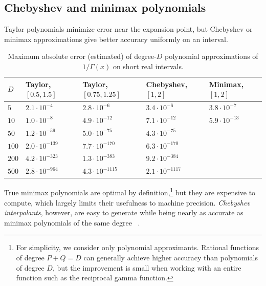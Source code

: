 \documentclass[reqno]{amsart}
\theoremstyle{definition}
\begin{document}
\subsection{Chebyshev and minimax polynomials}
\label{sect:taylorvs}

Taylor polynomials minimize error near the expansion point,
but Chebyshev or minimax approximations
give better accuracy uniformly on an interval.

\begin{table}
\setlength{\tabcolsep}{3pt}
\renewcommand{\arraystretch}{1.1}
\centering
\caption{Maximum absolute error (estimated) of degree-$D$ polynomial approximations of $1 / \Gamma(x)$ on short real intervals.}
\label{table:tabpolyapprox}
\small
\begin{tabular}{l | l l l l}
 $D$ & Taylor, $[0.5, 1.5]$ & Taylor, $[0.75, 1.25]$ & Chebyshev, $[1,2]$ & Minimax, $[1,2]$ \\
 \hline
 $5$  & $2.1 \cdot 10^{-4}$  &  $2.8 \cdot 10^{-6}$  &  $3.4 \cdot 10^{-6}$  &  $3.8 \cdot 10^{-7}$ \\
 $10$  & $1.0 \cdot 10^{-8}$  &  $4.9 \cdot 10^{-12}$  &  $7.1 \cdot 10^{-12}$  &  $5.9 \cdot 10^{-13}$ \\
 $50$  & $1.2 \cdot 10^{-59}$  &  $5.0 \cdot 10^{-75}$  &  $4.3 \cdot 10^{-75}$  &   \\
 $100$  & $2.0 \cdot 10^{-139}$  &  $7.7 \cdot 10^{-170}$  &  $6.3 \cdot 10^{-170}$  &   \\
 $200$  & $4.2 \cdot 10^{-323}$  &  $1.3 \cdot 10^{-383}$  &  $9.2 \cdot 10^{-384}$  &   \\
 $500$  & $2.8 \cdot 10^{-964}$  &  $4.3 \cdot 10^{-1115}$  &  $2.1 \cdot 10^{-1117}$  &   \\ [1ex]
\end{tabular}
\end{table}

True minimax polynomials are optimal by definition,\footnote{For simplicity, we consider only polynomial approximants. Rational
functions of degree $P + Q = D$ can generally achieve higher accuracy
than polynomials of degree $D$,
but the improvement is small when working with
an entire function such as the reciprocal gamma function.}
but they are expensive to compute,
which largely limits their usefulness to machine precision.
\emph{Chebyshev interpolants}, however, are easy to generate
while being nearly as accurate as minimax polynomials
of the same degree~\cite[Section 3.11]{DLMF} \cite[Theorem 16.1]{trefethen2019approximation}.
\end{document}

